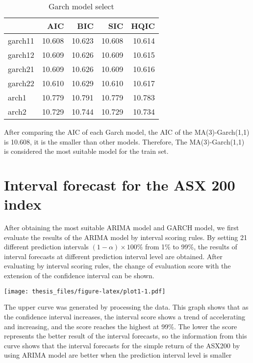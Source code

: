\documentclass{monashthesis}
\theoremstyle{definition}
\theoremstyle{definition}
\theoremstyle{definition}
\theoremstyle{remark}
\begin{document}
\begin{table}

\caption{\label{tab:table1}Garch model select}
\centering
\begin{tabular}[t]{lrrrr}
\toprule
  & AIC & BIC & SIC & HQIC\\
\midrule
garch11 & 10.608 & 10.623 & 10.608 & 10.614\\
garch12 & 10.609 & 10.626 & 10.609 & 10.615\\
garch21 & 10.609 & 10.626 & 10.609 & 10.616\\
garch22 & 10.610 & 10.629 & 10.610 & 10.617\\
arch1 & 10.779 & 10.791 & 10.779 & 10.783\\
arch2 & 10.729 & 10.744 & 10.729 & 10.734\\
\bottomrule
\end{tabular}
\end{table}

After comparing the AIC of each Garch model, the AIC of the
MA(3)-Garch(1,1) is 10.608, it is the smaller than other models.
Therefore, The MA(3)-Garch(1,1) is considered the most suitable model
for the train set.

\section{Interval forecast for the ASX 200
index}\label{interval-forecast-for-the-asx-200-index}

After obtaining the most suitable ARIMA model and GARCH model, we first
evaluate the results of the ARIMA model by interval scoring rules. By
setting 21 different prediction intervals \((1-\alpha)\times100\%\) from
1\% to 99\%, the results of interval forecasts at different prediction
interval level are obtained. After evaluating by interval scoring rules,
the change of evaluation score with the extension of the confidence
interval can be shown.

\texttt{[image: thesis\_files/figure-latex/plot1-1.pdf]}

The upper curve was generated by processing the data. This graph shows
that as the confidence interval increases, the interval score shows a
trend of accelerating and increasing, and the score reaches the highest
at 99\%. The lower the score represents the better result of the
interval forecasts, so the information from this curve shows that the
interval forecasts for the simple return of the ASX200 by using ARIMA
model are better when the prediction interval level is smaller
\end{document}
